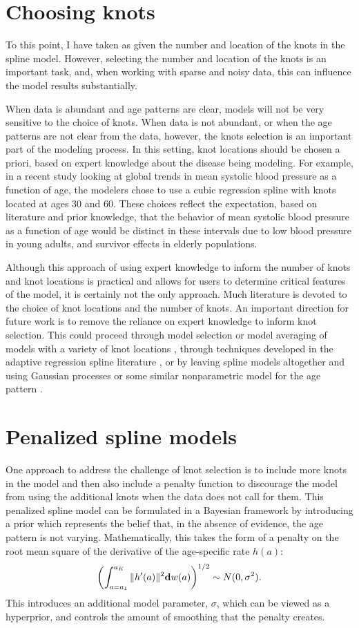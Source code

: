 \section{Choosing knots}

To this point, I have taken as given the number and location of the
knots in the spline model. However, selecting the number and location
of the knots is an important task, and, when working with sparse and
noisy data, this can influence the model results
substantially.

When data is abundant and age patterns are clear, models will not be
very sensitive to the choice of knots.  When data is not abundant, or
when the age patterns are not clear from the data, however, the knots
selection is an important part of the modeling process.  In this
setting, knot locations should be chosen a priori, based on expert
knowledge about the disease being modeling. For example, in a recent
study looking at global trends in mean systolic blood pressure as a
function of age, the modelers chose to use a cubic regression spline
with knots located at ages 30 and 60.\cite{danaei_national_2011} These
choices reflect the expectation, based on literature and prior
knowledge, that the behavior of mean systolic blood pressure as a
function of age would be distinct in these intervals due to low blood
pressure in young adults, and survivor effects in elderly populations.

Although this approach of using expert knowledge to inform the number
of knots and knot locations is practical and allows for users to
determine critical features of the model, it is certainly not the only
approach. Much literature is devoted to the choice of knot locations
and the number of knots.
An important direction for future work is to remove the reliance on
expert knowledge to inform knot selection.  This could proceed
through model selection or model averaging of models with a variety of
knot locations \cite{raftery_bayesian_1997}, through
techniques developed in the adaptive regression spline literature
\cite{friedman_multivariate_1991}, or by leaving spline models altogether and using Gaussian
processes or some similar nonparametric model for the age pattern
\cite{rasmussen_gaussian_2006,diggle_model-based_2010}.

\section{Penalized spline models}
One approach to address the challenge of knot selection is to include
more knots in the model and then also include a penalty function to
discourage the model from using the additional knots when the data
does not call for them.  This penalized spline model can be formulated in a
Bayesian framework by introducing a prior which represents the belief that, in
the absence of evidence, the age pattern is not varying.
Mathematically, this takes the form of a penalty on the root mean
square of the derivative of the age-specific rate $h(a)$:
\[
\left(\int _{a=a_1} ^{a_K} \| h'(a) \|^2 \mathbf{d} w(a)\right)^{1/2} \sim N(0, \sigma^2).
\]
This introduces an additional model parameter, $\sigma$, which can be
viewed as a hyperprior, and controls the amount of smoothing that the
penalty creates.

